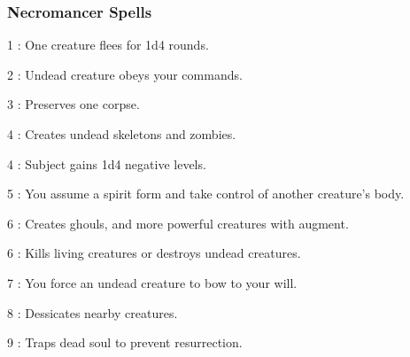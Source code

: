 \subsubsection{Necromancer Spells}
\begin{list}{}{\leftmargin=1em}
\item[1] : One creature flees for 1d4 rounds.
\item[2] : Undead creature obeys your commands.
\item[3] : Preserves one corpse.
\item[4] : Creates undead skeletons and zombies.
\item[4] : Subject gains 1d4 negative levels.
\item[5] : You assume a spirit form and take control of another creature's body.
\item[6] : Creates ghouls, and more powerful creatures with augment.
\item[6] : Kills living creatures or destroys undead creatures.
\item[7] : You force an undead creature to bow to your will.
\item[8] : Dessicates nearby creatures.
\item[9] : Traps dead soul to prevent resurrection.
\end{list}
